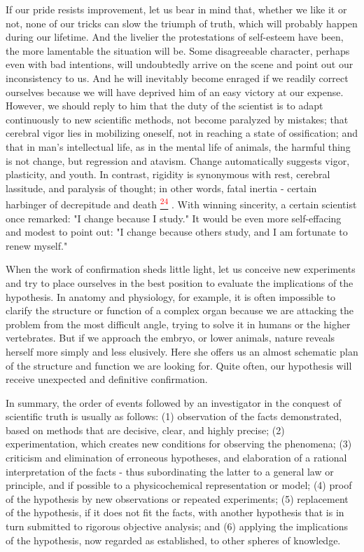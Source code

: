 \documentclass{article}
\newcommand{\noteref}[1]{%
 \hypertarget{ref:#1}{}%
 \hyperlink{note:#1}{\textsuperscript{\textcolor{red}{#1}}}%
}
\begin{document}
If our pride resists improvement, let us bear in mind that, whether we like it or not, none of our tricks can slow the triumph of truth, which will probably happen during our lifetime. And the livelier the protestations of self-esteem have been, the more lamentable the situation will be. Some disagreeable character, perhaps even with bad intentions, will undoubtedly arrive on the scene and point out our inconsistency to us. And he will inevitably become enraged if we readily correct ourselves because we will have deprived him of an easy victory at our expense. However, we should reply to him that the duty of the scientist is to adapt continuously to new scientific methods, not become paralyzed by mistakes; that cerebral vigor lies in mobilizing oneself, not in reaching a state of ossification; and that in man’s intellectual life, as in the mental life of animals, the harmful thing is not change, but regression and atavism. Change automatically suggests vigor, plasticity, and youth. In contrast, rigidity is synonymous with rest, cerebral lassitude, and paralysis of thought; in other words, fatal inertia - certain harbinger of decrepitude and death\noteref{24}. With winning sincerity, a certain scientist once remarked: "I change because I study." It would be even more self-effacing and modest to point out: "I change because others study, and I am fortunate to renew myself."

When the work of confirmation sheds little light, let us conceive new experiments and try to place ourselves in the best position to evaluate the implications of the hypothesis. In anatomy and physiology, for example, it is often impossible to clarify the structure or function of a complex organ because we are attacking the problem from the most difficult angle, trying to solve it in humans or the higher vertebrates. But if we approach the embryo, or lower animals, nature reveals herself more simply and less elusively. Here she offers us an almost schematic plan of the structure and function we are looking for. Quite often, our hypothesis will receive unexpected and definitive confirmation.

In summary, the order of events followed by an investigator in the conquest of scientific truth is usually as follows: (1) observation of the facts demonstrated, based on methods that are decisive, clear, and highly precise; (2) experimentation, which creates new conditions for observing the phenomena; (3) criticism and elimination of erroneous hypotheses, and elaboration of a rational interpretation of the facts - thus subordinating the latter to a general law or principle, and if possible to a physicochemical representation or model; (4) proof of the hypothesis by new observations or repeated experiments; (5) replacement of the hypothesis, if it does not fit the facts, with another hypothesis that is in turn submitted to rigorous objective analysis; and (6) applying the implications of the hypothesis, now regarded as established, to other spheres of knowledge.
\end{document}
